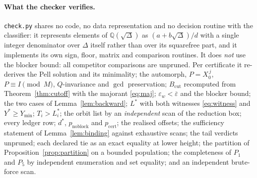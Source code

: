 \documentclass[11pt]{article}
\theoremstyle{definition}
\theoremstyle{remark}
\newcommand{\Q}{\mathbb{Q}}
\newcommand{\epsbar}{\overline{\varepsilon}}
\newcommand{\epsw}{\varepsilon_w}
\begin{document}
\paragraph{What the checker verifies.}
\texttt{check.py} shares no code, no data representation and no decision routine with the
classifier: it represents elements of $\Q(\sqrt\Delta)$ as $(a+b\sqrt\Delta)/d$ with a single
integer denominator over $\Delta$ itself rather than over its squarefree part, and it implements
its own sign, floor, matrix and comparison routines. It does \emph{not} use the blocker bound:
all competitor comparisons are unpruned. Per certificate it re-derives the Pell solution and its
minimality; the automorph, $P=X_0^{\,j}$, $P\equiv I\pmod M$, $Q$-invariance and $\gcd$
preservation; $B_{\mathrm{cut}}$ recomputed from Theorem~\ref{thm:cutoff} with the majorant
\eqref{eq:maj}; $\epsw<\epsbar$ and the blocker bound; the two cases of
Lemma~\ref{lem:backward}; $L^{*}$ with both witnesses \eqref{eq:witness} and $Y^{*}\ge Y_{\min}$;
$T_i>L_i^{*}$; the orbit list by an \emph{independent} scan of the reduction box; every ledger
row; $d^{*}$, $p_{\mathrm{noblock}}$ and $p_{\mathrm{cert}}$; the realised offsets; the
sufficiency statement of Lemma~\ref{lem:binding} against exhaustive scans; the tail verdicts
unpruned; each declared tie as an exact equality at lower height; the partition of
Proposition~\ref{prop:partition} on a bounded population; the completeness of $P_1$ and $P_5$ by
independent enumeration and set equality; and an independent brute-force scan.
\end{document}
